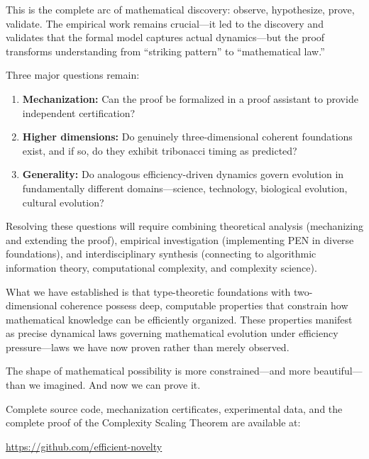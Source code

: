 \documentclass[11pt]{article}
\theoremstyle{definition}
\theoremstyle{remark}
\begin{document}
This is the complete arc of mathematical discovery: observe, hypothesize, prove, validate. The
empirical work remains crucial---it led to the discovery and validates that the formal model captures
actual dynamics---but the proof transforms understanding from ``striking pattern'' to ``mathematical
law.''

Three major questions remain:

\begin{enumerate}
\item \textbf{Mechanization:} Can the proof be formalized in a proof assistant to provide independent
certification?

\item \textbf{Higher dimensions:} Do genuinely three-dimensional coherent foundations exist, and
if so, do they exhibit tribonacci timing as predicted?

\item \textbf{Generality:} Do analogous efficiency-driven dynamics govern evolution in fundamentally
different domains---science, technology, biological evolution, cultural evolution?
\end{enumerate}

Resolving these questions will require combining theoretical analysis (mechanizing and extending
the proof), empirical investigation (implementing PEN in diverse foundations), and interdisciplinary
synthesis (connecting to algorithmic information theory, computational complexity, and complexity
science).

What we have established is that type-theoretic foundations with two-dimensional coherence
possess deep, computable properties that constrain how mathematical knowledge can be efficiently
organized. These properties manifest as precise dynamical laws governing mathematical evolution
under efficiency pressure---laws we have now proven rather than merely observed.

The shape of mathematical possibility is more constrained---and more beautiful---than we imagined.
And now we can prove it.

\vspace{1em}

\noindent
Complete source code, mechanization certificates, experimental data, and the complete proof of
the Complexity Scaling Theorem are available at:

\begin{center}
\url{https://github.com/efficient-novelty}
\end{center}
\end{document}
